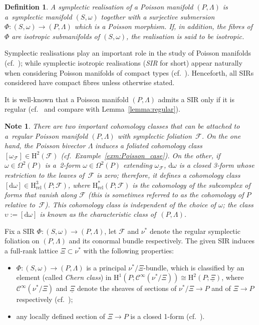 \documentclass[10pt,a4paper]{amsart}
\numberwithin{equation}{section}
\newtheorem{Definition}[Theorem]{Definition}
\newtheorem{Note}[Theorem]{Note}
\newcommand{\de}{\mathrm{d}} %
\newcommand{\SM}{(S,\omega)} %
\newcommand{\PM}{(P,\Lambda)} %
\newcommand{\HH}{\mathrm{H}}
\begin{document}
\begin{Definition}\label{defn:sir}
A {\it symplectic realisation} of a Poisson manifold $\PM$ is a~symplectic manifold $\SM$ together with a surjective submersion $\Phi \colon \SM \to \PM$ which is a Poisson morphism. If, in addition, the f\/ibres of $\Phi$ are isotropic submanifolds of $\SM$, the realisation is said to be {\it isotropic}.
\end{Definition}

Symplectic realisations play an important role in the study of Poisson manifolds (cf.~\cite{cdw}); while symplectic isotropic realisations ({\it SIR} for short) appear naturally when considering Poisson manifolds of compact types (cf.~\cite{PMCT1,PMCT2}). Henceforth, all SIRs considered have compact f\/ibres unless otherwise stated.

It is well-known that a Poisson manifold $\PM$ admits a SIR only if it is regular (cf.~\cite{dd} and compare with Lemma~\ref{lemma:regular}).

\begin{Note}\label{obs:poisson_coho}
There are two important cohomology classes that can be attached to a~regular Poisson manifold $\PM$ with symplectic foliation~$\mathcal{F}$. On the one hand, the Poisson bivector $\Lambda$ induces a foliated cohomology class $[\omega_{\mathcal{F}}] \in \HH^2(\mathcal{F})$ (cf.\ Example~\ref{exm:Poisson_case}). On the other, if $\omega \in \Omega^2(P)$ is a~2-form $\omega \in \Omega^2(P)$ extending $\omega_{\mathcal{F}}$, $\de \omega$ is a closed 3-form whose restriction to the leaves of~$\mathcal{F}$ is zero; therefore, it def\/ines a cohomology class $[\de \omega ] \in \HH^3_{\mathrm{rel}}(P;\mathcal{F})$, where $\HH^*_{\mathrm{rel}}(P;\mathcal{F})$ is the cohomology of the subcomplex of forms that vanish along $\mathcal{F}$ (this is sometimes referred to as the cohomology of $P$ {\em relative} to~$\mathcal{F}$). This cohomology class is independent of the choice of $\omega$; the class $\upsilon:=[\de \omega]$ is known as the {\it characteristic class} of~$\PM$.
\end{Note}

Fix a SIR $\Phi \colon \SM \to \PM$, let $\mathcal{F}$ and $\nu^*$ denote the regular symplectic foliation on $\PM$ and its conormal bundle respectively. The given SIR induces a full-rank lattice $\Xi \subset \nu^*$ with the following properties:
\begin{itemize} \itemsep=0pt
\item $\Phi \colon \SM \to \PM$ is a principal $\nu^*/\Xi$-bundle, which is classif\/ied by an element (called {\it Chern class}) in $\HH^1 (P;\mathcal{C}^{\infty} (\nu^*/\Xi ) ) \cong \HH^2(P;\underline{\Xi})$, where $\mathcal{C}^{\infty}(\nu^*/\Xi)$ and $\underline{\Xi}$ denote the sheaves of sections of $\nu^*/ \Xi \to P$ and of $\Xi \to P$ respectively (cf.\ \cite[Corollary~2]{dd});
\item any locally def\/ined section of $\Xi \to P$ is a closed 1-form (cf.\ \cite[Corollary~1]{dd}).
\end{itemize}
\end{document}
